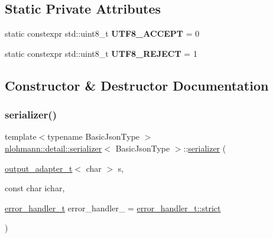 \subsection*{Static Private Attributes}
\begin{DoxyCompactItemize}
\item 
\mbox{\label{classnlohmann_1_1detail_1_1serializer_a2311a8c756c4a119aa82cd55301d13bc}} 
static constexpr std\+::uint8\+\_\+t {\bfseries U\+T\+F8\+\_\+\+A\+C\+C\+E\+PT} = 0
\item 
\mbox{\label{classnlohmann_1_1detail_1_1serializer_a833bd5805e4380549f4e21c304820d6d}} 
static constexpr std\+::uint8\+\_\+t {\bfseries U\+T\+F8\+\_\+\+R\+E\+J\+E\+CT} = 1
\end{DoxyCompactItemize}


\subsection{Constructor \& Destructor Documentation}
\mbox{\label{classnlohmann_1_1detail_1_1serializer_ac010525281d97867ee842da37294fe83}} 
\subsubsection{\texorpdfstring{serializer()}{serializer()}}
{\footnotesize\ttfamily template$<$typename Basic\+Json\+Type $>$ \\
\mbox{\hyperlink{classnlohmann_1_1detail_1_1serializer}{nlohmann\+::detail\+::serializer}}$<$ Basic\+Json\+Type $>$\+::\mbox{\hyperlink{classnlohmann_1_1detail_1_1serializer}{serializer}} (\begin{DoxyParamCaption}\item[{\mbox{\hyperlink{namespacenlohmann_1_1detail_a9b680ddfb58f27eb53a67229447fc556}{output\+\_\+adapter\+\_\+t}}$<$ char $>$}]{s,  }\item[{const char}]{ichar,  }\item[{\mbox{\hyperlink{namespacenlohmann_1_1detail_a5a76b60b26dc8c47256a996d18d967df}{error\+\_\+handler\+\_\+t}}}]{error\+\_\+handler\+\_\+ = {\ttfamily \mbox{\hyperlink{namespacenlohmann_1_1detail_a5a76b60b26dc8c47256a996d18d967dfa2133fd717402a7966ee88d06f9e0b792}{error\+\_\+handler\+\_\+t\+::strict}}} }\end{DoxyParamCaption})\hspace{0.3cm}{\ttfamily [inline]}}


